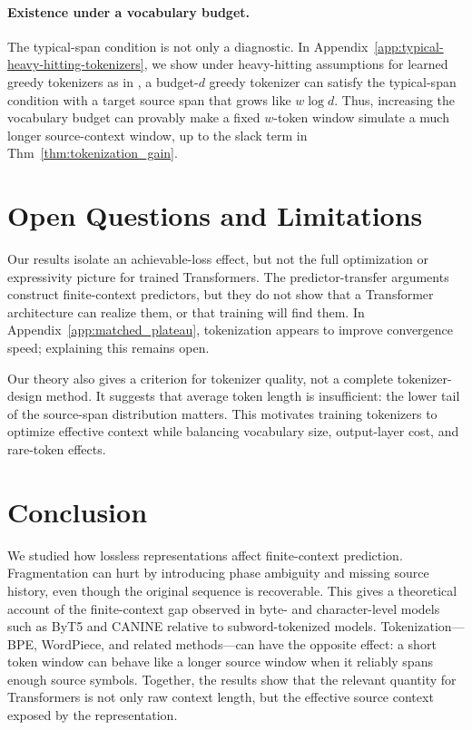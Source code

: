 \documentclass{article}
\theoremstyle{plain}
\theoremstyle{definition}
\theoremstyle{remark}
\begin{document}
    \paragraph{Existence under a vocabulary budget.}
    The typical-span condition is not only a diagnostic. In
    Appendix~\ref{app:typical-heavy-hitting-tokenizers}, we show under heavy-hitting assumptions for learned greedy tokenizers
    as in \citep{rajaramanAnalysisTokenizationTransformers2024}, a budget-$d$ greedy
    tokenizer can satisfy the typical-span condition with a target source span that
    grows like $w\log d$. Thus, increasing the vocabulary budget can provably make a
    fixed $w$-token window simulate a much longer source-context window, up to
    the slack term in Thm~\ref{thm:tokenization_gain}.
    
    \section{Open Questions and Limitations}
    \label{sec:discussion}
    
    Our results isolate an achievable-loss effect, but not the full optimization or
    expressivity picture for trained Transformers. The predictor-transfer arguments
    construct finite-context predictors, but they do not show that a 
    Transformer architecture can realize them, or that training will find them. In
    Appendix~\ref{app:matched_plateau}, tokenization appears to
    improve convergence speed; explaining this remains open.
    
    Our theory also gives a criterion for tokenizer quality, not a complete
    tokenizer-design method. It suggests that average token length is insufficient:
    the lower tail of the source-span distribution matters. This motivates training
    tokenizers to optimize effective context while balancing vocabulary size,
    output-layer cost, and rare-token effects.
    

    \section{Conclusion}
    We studied how lossless representations affect finite-context prediction.
    Fragmentation can hurt by introducing phase ambiguity and missing source
    history, even though the original sequence is recoverable. This gives a
    theoretical account of the finite-context gap observed in byte- and
    character-level models such as ByT5 and CANINE relative to subword-tokenized
    models. Tokenization---BPE, WordPiece, and related methods---can have the
    opposite effect: a short token window can behave like a longer source window
    when it reliably spans enough source symbols. Together, the results show that
    the relevant quantity for Transformers is not only raw context length, but the
    effective source context exposed by the representation.
    
\end{document}
